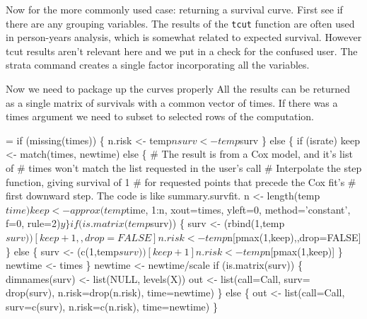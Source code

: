 \documentclass{article}
\begin{document}
Now for the more commonly used case: returning a survival curve.
First see if there are any grouping variables.
The results of the \Verb!tcut! function are often used in person-years
analysis, which is somewhat related to expected survival.  However
tcut results aren't relevant here and we put in a check for the         %
confused user.
The strata command creates a single factor incorporating all the 
variables.

Now we need to package up the curves properly
All the results can
be returned as a single matrix of survivals with a common vector of times.
If there was a times argument we need to subset to selected rows of the
computation.
\begin{nwchunk}
=
 if (missing(times)) \{
     n.risk <- temp$n
     surv <- temp$surv
     \}
 else \{
     if (israte) keep <- match(times, newtime)
     else \{
         # The result is from a Cox model, and it's list of
         #  times won't match the list requested in the user's call
         # Interpolate the step function, giving survival of 1
         #  for requested points that precede the Cox fit's
         #  first downward step.  The code is like summary.survfit.
         n <- length(temp$time)
         keep <- approx(temp$time, 1:n, xout=times, yleft=0,
                        method='constant', f=0, rule=2)$y
         \}
 
     if (is.matrix(temp$surv)) \{
         surv <- (rbind(1,temp$surv))[keep+1,,drop=FALSE]
         n.risk <- temp$n[pmax(1,keep),,drop=FALSE]
          \}
     else \{
         surv <- (c(1,temp$surv))[keep+1]
         n.risk <- temp$n[pmax(1,keep)]
         \}
     newtime <- times
     \}
 newtime <- newtime/scale
 if (is.matrix(surv)) \{
     dimnames(surv) <- list(NULL, levels(X))
     out <- list(call=Call, surv= drop(surv), n.risk=drop(n.risk),
                     time=newtime)
     \}
 else \{
      out <- list(call=Call, surv=c(surv), n.risk=c(n.risk),
                    time=newtime)
      \}
\end{nwchunk}
\end{document}
